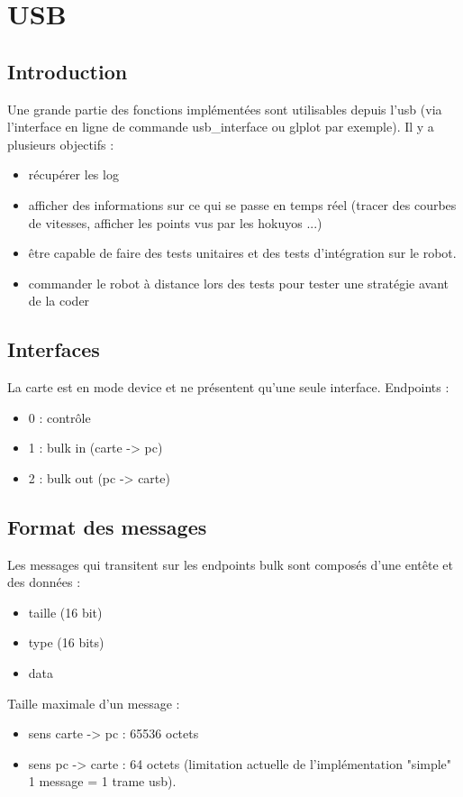 \chapter{USB}

\section{Introduction}

Une grande partie des fonctions implémentées sont utilisables depuis l'usb (via l'interface en ligne de commande usb\_interface ou glplot par exemple). Il y a plusieurs objectifs :
\begin{itemize}
\item récupérer les log
\item afficher des informations sur ce qui se passe en temps réel (tracer des courbes de vitesses, afficher les points vus par les hokuyos ...)
\item être capable de faire des tests unitaires et des tests d'intégration sur le robot.
\item commander le robot à distance lors des tests pour tester une stratégie avant de la coder
\end{itemize}

\section{Interfaces}
La carte est en mode device et ne présentent qu'une seule interface.
Endpoints :
\begin{itemize}
\item 0 : contrôle
\item 1 : bulk in (carte -> pc)
\item 2 : bulk out (pc -> carte)
\end{itemize}

\section{Format des messages}

Les messages qui transitent sur les endpoints bulk sont composés d'une entête et des données :

\begin{itemize}
\item taille (16 bit)
\item type (16 bits)
\item data
\end{itemize}


Taille maximale d'un message :
\begin{itemize}
\item sens carte -> pc : 65536 octets
\item sens pc -> carte : 64 octets (limitation actuelle de l'implémentation "simple" 1 message = 1 trame usb).
\end{itemize}

\clearpage

